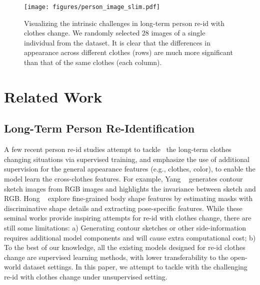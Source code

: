 \documentclass[10pt,twocolumn,letterpaper]{article}
\newcommand{\reid}{re-id}
\newcommand{\name}{\text{Deepchange}}
\def\eg{e.g.}
\begin{document}
\begin{figure}[!thb]
\center
{\texttt{[image: figures/person\_image\_slim.pdf]}}\\
\caption{Visualizing the intrinsic challenges in long-term person \reid{} with clothes change. We randomly selected $28$ images of a single individual from the \name{} \cite{Deepchange} dataset.
It is clear that the differences in appearance across different clothes (rows) are much more significant than that of the same clothes (each column).
}
\label{fig:clothes-change}
\vspace{-10pt}
\end{figure}



\section{Related Work}
\label{sec:related-work}
\subsection{Long-Term Person Re-Identification}
A few recent person \reid{} studies attempt  to tackle~\cite{Change:1,Change:2,change:3,change:4,change:5,change:6,change:7} the long-term clothes changing situations via supervised training, and emphasize the use of additional supervision for the general appearance features (\eg, clothes, color), to  enable  the model learn the cross-clothes features. For example, 
Yang \etal~\cite{Change:1} generates contour sketch images from RGB images and highlights the invariance between sketch and RGB.
Hong \etal~\cite{change:8} explore fine-grained body shape features by estimating masks with discriminative shape details and extracting pose-specific features. 
While these seminal works provide inspiring attempts for \reid{} with clothes change, there are still some limitations: 
a) Generating contour sketches or other side-information requires additional model components and will cause extra computational cost; 
b) To the best of our knowledge, all the existing models designed for \reid{} clothes change are supervised learning methods, with lower transferability to the open-world dataset settings. 
In this paper, we attempt to tackle with the challenging \reid{} with clothes change under unsupervised setting. 
\end{document}
